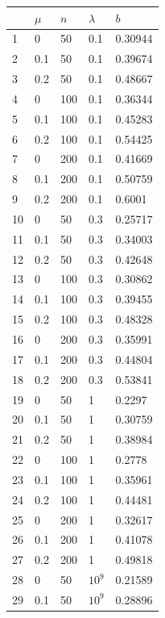 \documentclass{article}
\begin{document}
\begin{table}
  \begin{tabular}{|l|l|l|l|l|}
    \hline
       & $\mu$ & $n$ & $\lambda$  & $b$ \\
    \hline
    1  & 0   & 50  & 0.1   & 0.30944 \\
    2  & 0.1 & 50  & 0.1   & 0.39674 \\
    3  & 0.2 & 50  & 0.1   & 0.48667 \\
    4  & 0   & 100 & 0.1   & 0.36344 \\
    5  & 0.1 & 100 & 0.1   & 0.45283 \\
    6  & 0.2 & 100 & 0.1   & 0.54425 \\
    7  & 0   & 200 & 0.1   & 0.41669 \\
    8  & 0.1 & 200 & 0.1   & 0.50759 \\
    9  & 0.2 & 200 & 0.1   & 0.6001  \\
    10 & 0   & 50  & 0.3   & 0.25717 \\
    11 & 0.1 & 50  & 0.3   & 0.34003 \\
    12 & 0.2 & 50  & 0.3   & 0.42648 \\
    13 & 0   & 100 & 0.3   & 0.30862 \\
    14 & 0.1 & 100 & 0.3   & 0.39455 \\
    15 & 0.2 & 100 & 0.3   & 0.48328 \\
    16 & 0   & 200 & 0.3   & 0.35991 \\
    17 & 0.1 & 200 & 0.3   & 0.44804 \\
    18 & 0.2 & 200 & 0.3   & 0.53841 \\
    19 & 0   & 50  & 1     & 0.2297  \\
    20 & 0.1 & 50  & 1     & 0.30759 \\
    21 & 0.2 & 50  & 1     & 0.38984 \\
    22 & 0   & 100 & 1     & 0.2778  \\
    23 & 0.1 & 100 & 1     & 0.35961 \\
    24 & 0.2 & 100 & 1     & 0.44481 \\
    25 & 0   & 200 & 1     & 0.32617 \\
    26 & 0.1 & 200 & 1     & 0.41078 \\
    27 & 0.2 & 200 & 1     & 0.49818 \\
    28 & 0   & 50  & $10^9$ & 0.21589 \\
    29 & 0.1 & 50  & $10^9$ & 0.28896 \\

\end{tabular}
\end{table}
\end{document}
